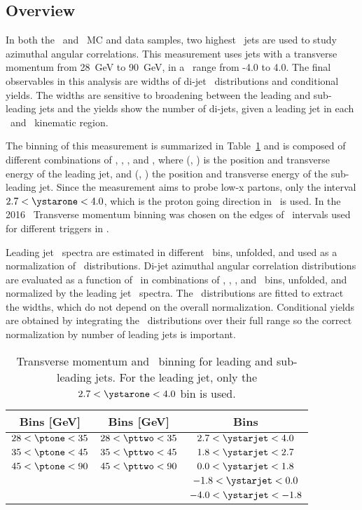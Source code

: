 
\subsection{Overview}

In both the \pp\ and \pPb\ MC and data samples, two highest \pt\ jets are used to study azimuthal angular correlations. This measurement uses jets with a transverse momentum from 28~GeV to 90~GeV, in a \ystar\ range from -4.0 to 4.0. The final observables in this analysis are widths of di-jet \Dphi\ distributions and conditional yields. The widths are sensitive to broadening between the leading and sub-leading jets and the yields show the number of di-jets, given a leading jet in each \pT\ and \ystar\ kinematic region. 

The binning of this measurement is summarized in  Table~\ref{tab:binning} and is composed of different combinations of \ystarone, \ystartwo, \ptone, and \pttwo, where (\ystarone, \ptone) is the position and transverse energy of the leading jet, and (\ystartwo, \pttwo) the position and transverse energy of the sub-leading jet. Since the measurement aims to probe low-x partons, only the interval $2.7<\ystarone<4.0$, which is the proton going direction in \pPb\ is used. In the 2016 \pPb\ Transverse momentum binning was chosen on the edges of \pt\ intervals used for different triggers in \pp. 

Leading jet \ptone\ spectra are estimated in different \ystarone\ bins, unfolded, and used as a normalization of \Dphi\ distributions. Di-jet azimuthal angular correlation distributions are evaluated as a function of \Dphi\ in combinations of \ystarone, \ystartwo, \ptone, and \pttwo\ bins, unfolded, and normalized by the leading jet \pt\ spectra. The \Dphi\ distributions are fitted to extract the widths, which do not depend on the overall normalization. Conditional yields are obtained by integrating the \Dphi\ distributions over their full range so the correct normalization by number of leading jets is important. 

\begin{table}
	\centering
	\begin{tabular}{|| c | c | c || } 
		\hline
		\ptone Bins [GeV] & \pttwo Bins [GeV] & \ystartwo Bins \\ 
		\hline
		$28<\ptone<35$   & $28<\pttwo<35$  & $2.7<\ystarjet<4.0$ \\ 
		$35<\ptone<45$   & $35<\pttwo<45$  & $1.8<\ystarjet<2.7$ \\ 
		$45<\ptone<90$   & $45<\pttwo<90$  & $0.0<\ystarjet<1.8$ \\
						 & 				   & $-1.8<\ystarjet<0.0$ \\
						 &				   & $-4.0<\ystarjet<-1.8$ \\
		\hline
	\end{tabular}
	\caption{\label{tab:binning} Transverse momentum and \ystar\ binning for leading and sub-leading jets. For the leading jet, only the $2.7<\ystarone<4.0$ bin is used. }
\end{table}

